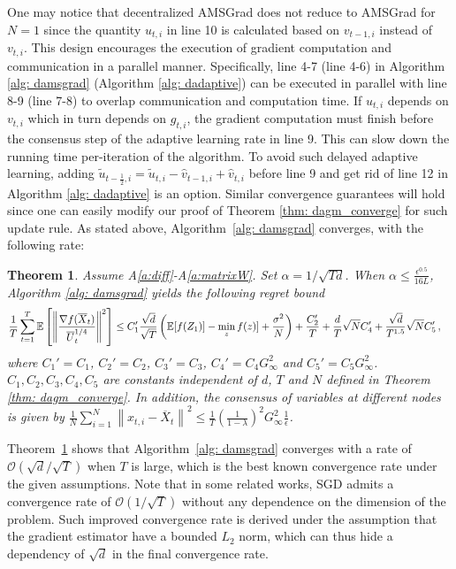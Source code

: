 \documentclass{article} %
\newtheorem{theorem}{Theorem}
\begin{document}
One may notice that decentralized AMSGrad does not reduce to AMSGrad for $N=1$ since the quantity $u_{t,i}$ in line 10 is calculated based on $v_{t-1,i}$ instead of $v_{t,i}$.
This design encourages the execution of gradient computation and communication in a parallel manner. 
Specifically, line 4-7 (line 4-6) in Algorithm \ref{alg: damsgrad} (Algorithm \ref{alg: dadaptive}) can be executed in parallel with line 8-9 (line 7-8) to overlap communication and computation time. 
If $u_{t,i}$ depends on $v_{t,i}$ which in turn depends on $g_{t,i}$, the gradient computation must finish before the consensus step of the adaptive learning rate in line 9. 
This can slow down the running time per-iteration of the algorithm. 
To avoid such delayed adaptive learning, adding $\tilde u_{t-\frac{1}{2},i} = \tilde u_{t,i} - \hat v_{t-1,i} + \hat v_{t,i}$ before line 9 and get rid of line 12 in Algorithm \ref{alg: dadaptive} is an option.
Similar convergence guarantees will hold since one can easily modify our proof of Theorem \ref{thm: dagm_converge} for such update rule. 
As stated above, Algorithm~\ref{alg: damsgrad} converges, with the following rate:
\begin{theorem}\label{thm: dams_converge}
Assume A\ref{a:diff}-A\ref{a:matrixW}.
Set $\alpha = 1/\sqrt{Td}$. When $\alpha  \leq \frac{\epsilon^{0.5}}{16L} $, Algorithm \ref{alg: damsgrad} yields the following regret bound
{\small 
	  \begin{align}\notag
	  & \frac{1}{T}\sum_{t=1}^T  \mathbb E \left [\left\|\frac{\nabla f( \overline X_{t})}{\overline U_{t}^{1/4}}\right\|^2  \right] 
	  \leq    C_1' \frac{\sqrt{d}}{\sqrt{T}} \left(\mathbb E  [f( Z_{1})]  - \min_{z} f(z)]  + \frac{\sigma^2}{N}\right)  +  \frac{ C_2'}{T}    +   \frac{d}{T }\sqrt{N} C_4' + \frac{\sqrt{d}}{T^{1.5} } \sqrt{N} C_5'\, ,
	  \end{align}
	  }%
	where $C_1' = C_1$, $C_2' = C_2$, $C_3' = C_3$, $C_4' = C_4G_{\infty}^2$ and $C_5' = C_5 G_{\infty}^2 $. $C_1,C_2, C_3, C_4, C_5$ are constants independent of $d$, $T$ and $N$ defined in Theorem \ref{thm: dagm_converge}. In addition, the consensus of variables at different nodes is given by $\frac{1}{N}\sum_{i=1}^N\left\| {  x_{t,i} -   \overline X_{t}}  \right\|^2   \leq \frac{1}{T} \left (\frac{1}{1-\lambda} \right)^2  G_{\infty}^2 \frac{1}{\epsilon}$. 
\end{theorem}

Theorem~\ref{thm: dams_converge} shows that Algorithm~\ref{alg: damsgrad} converges with a rate of  $\mathcal{O}(\sqrt{d}/\sqrt{T})$ when $T$ is large, which is the best known convergence rate under the given assumptions. 
Note that in some related works, SGD admits a convergence rate of $\mathcal{O}(1/\sqrt{T})$ without any dependence on the dimension of the problem.
Such improved convergence rate is derived under the assumption that the gradient estimator have a bounded $L_2$ norm, which can thus hide a dependency of $\sqrt{d}$ in the final convergence rate. 
\end{document}
